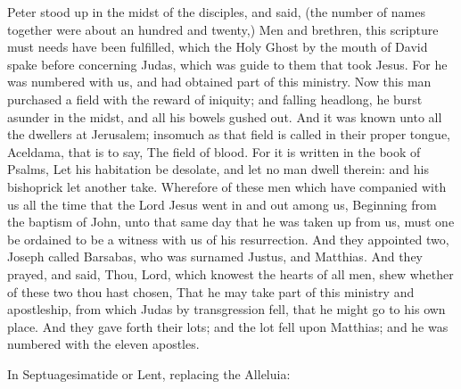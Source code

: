  Peter stood up in the midst of the disciples, and said, (the number of names together were about an hundred and twenty,) Men and brethren, this scripture must needs have been fulfilled, which the Holy Ghost by the mouth of David spake before concerning Judas, which was guide to them that took Jesus. For he was numbered with us, and had obtained part of this ministry. Now this man purchased a field with the reward of iniquity; and falling headlong, he burst asunder in the midst, and all his bowels gushed out. And it was known unto all the dwellers at Jerusalem; insomuch as that field is called in their proper tongue, Aceldama, that is to say, The field of blood. For it is written in the book of Psalms, Let his habitation be desolate, and let no man dwell therein: and his bishoprick let another take. Wherefore of these men which have companied with us all the time that the Lord Jesus went in and out among us, Beginning from the baptism of John, unto that same day that he was taken up from us, must one be ordained to be a witness with us of his resurrection. And they appointed two, Joseph called Barsabas, who was surnamed Justus, and Matthias. And they prayed, and said, Thou, Lord, which knowest the hearts of all men, shew whether of these two thou hast chosen, That he may take part of this ministry and apostleship, from which Judas by transgression fell, that he might go to his own place. And they gave forth their lots; and the lot fell upon Matthias; and he was numbered with the eleven apostles.


\begin{rubric}
{In Septuagesimatide or Lent, replacing the Alleluia:}
\end{rubric}\par\noindent


